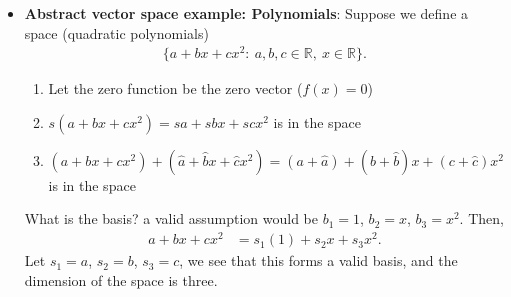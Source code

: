 \documentclass{report}
\begin{document}
\begin{itemize}
        \item \textbf{Abstract vector space example: Polynomials}: Suppose we define a space (quadratic polynomials)
            \begin{align*}
                \{
                    a + bx + cx^{2}:\ a,b,c \in \mathbb{R},\ x\in\mathbb{R}
                \}
            .\end{align*}
            \bigbreak \noindent 
            \begin{enumerate}
                \item Let the zero function be the zero vector ($f(x) = 0$)
                \item $s(a+bx+cx^{2}) = sa+sbx + scx^{2}$ is in the space
                \item $(a + bx +cx^{2}) + (\hat{a} + \hat{b}x + \hat{c}x^{2}) = (a + \hat{a}) + (b + \hat{b})x + (c + \hat{c})x^{2}$ is in the space
            \end{enumerate}
            What is the basis? a valid assumption would be $b_{1} = 1$, $b_{2} = x$, $b_{3} = x^{2}$. Then,
            \begin{align*}
                a + bx + cx^{2} &= s_1 (1) + s_2x + s_3x^{2}
            .\end{align*}
            Let $s_1 = a$, $s_2 = b$, $s_3  = c$, we see that this forms a valid basis, and the dimension of the space is three.
    \end{itemize}



    \pagebreak 
\end{document}
